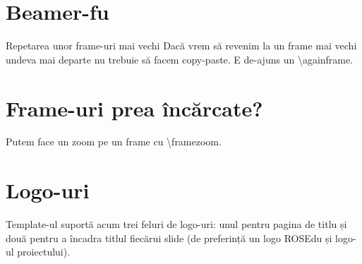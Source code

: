 \documentclass{beamer}
\begin{document}
\section{Beamer-fu}
\begin{frame}{Repetarea unor frame-uri mai vechi}
Dacă vrem să revenim la un frame mai vechi undeva mai departe nu trebuie să
facem copy-paste. E de-ajuns un \textbackslash againframe.
\end{frame}

\section{Frame-uri prea încărcate?}
\begin{frame}
Putem face un zoom pe un frame cu \textbackslash framezoom.
\end{frame}

\section{Logo-uri}
\begin{frame}
Template-ul suportă acum trei feluri de logo-uri: unul pentru pagina de titlu
și două pentru a încadra titlul fiecărui slide (de preferință un logo ROSEdu
și logo-ul proiectului).
\end{frame}
\end{document}
